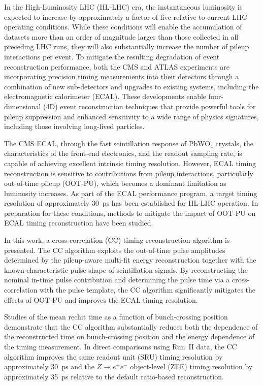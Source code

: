 In the High-Luminosity LHC (HL-LHC) era, the instantaneous luminosity is expected to increase by approximately a factor of five relative to current LHC operating conditions.
While these conditions will enable the accumulation of datasets more than an order of magnitude larger than those collected in all preceding LHC runs, they will also substantially increase the number of pileup interactions per event.
To mitigate the resulting degradation of event reconstruction performance, both the CMS and ATLAS experiments are incorporating precision timing measurements into their detectors through a combination of new sub-detectors and upgrades to existing systems, including the electromagnetic calorimeter (ECAL).
These developments enable four-dimensional (4D) event reconstruction techniques that provide powerful tools for pileup suppression and enhanced sensitivity to a wide range of physics signatures, including those involving long-lived particles.

The CMS ECAL, through the fast scintillation response of PbWO$_4$ crystals, the characteristics of the front-end electronics, and the readout sampling rate, is capable of achieving excellent intrinsic timing resolution.
However, ECAL timing reconstruction is sensitive to contributions from pileup interactions, particularly out-of-time pileup (OOT-PU), which becomes a dominant limitation as luminosity increases.
As part of the ECAL performance program, a target timing resolution of approximately 30~ps has been established for HL-LHC operation.
In preparation for these conditions, methods to mitigate the impact of OOT-PU on ECAL timing reconstruction have been studied.

In this work, a cross-correlation (CC) timing reconstruction algorithm is presented.
The CC algorithm exploits the out-of-time pulse amplitudes determined by the pileup-aware multi-fit energy reconstruction together with the known characteristic pulse shape of scintillation signals.
By reconstructing the nominal in-time pulse contribution and determining the pulse time via a cross-correlation with the pulse template, the CC algorithm significantly mitigates the effects of OOT-PU and improves the ECAL timing resolution.

Studies of the mean rechit time as a function of bunch-crossing position demonstrate that the CC algorithm substantially reduces both the dependence of the reconstructed time on bunch-crossing position and the energy dependence of the timing measurement.
In direct comparisons using Run~II data, the CC algorithm improves the same readout unit (SRU) timing resolution by approximately 30~ps and the $Z \rightarrow e^{+}e^{-}$ object-level (ZEE) timing resolution by approximately 35~ps relative to the default ratio-based reconstruction.

